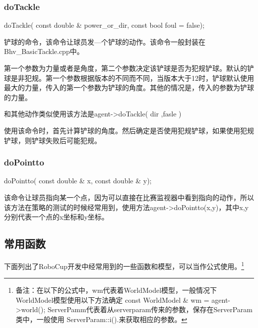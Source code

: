\subsubsection{doTackle}
\begin{Code}
	doTackle( const double & power_or_dir, const bool foul = false);
\end{Code}

铲球的命令，该命令让球员发—个铲球的动作。该命令一般封装在Bhv_BasicTackle.cpp中。

第一个参数为力量或者是角度，第二个参数决定该铲球是否为犯规铲球。默认的铲球是非犯规。第一个参数根据版本的不同而不同，当版本大于12时，铲球默认使用最大的力量，传入的第一个参数为铲球的角度。其他的情况是，传入的参数为铲球的力量。

和其他动作类似使用该方法是agent->doTackle( dir ,fasle )

使用该命令时，首先计算铲球的角度。然后确定是否使用犯规铲球，如果使用犯规铲球，则铲球失败后可能犯规。

\subsubsection{doPointto}
\begin{Code}
doPointto( const double & x, const double & y);
\end{Code}


该命令让球员指向某一个点，因为可以直接在比赛监视器中看到指向的动作，所以该方法在策略的测试的时候经常用到，使用方法agent->doPointto(x,y)，其中x,y分别代表一个点的x坐标和y坐标。 





\subsection{常用函数}
下面列出了RoboCup开发中经常用到的一些函数和模型，可以当作公式使用。\footnote{备注：在以下的公式中，wm代表着WorldModel模型，一般情况下WorldModel模型使用以下方法确定 const WorldModel \& wm = agent->world();	ServerPamm代表着从serverparam传来的参数，保存在ServerParam类中，一般使用 ServerParam::i().来获取相应的参数。}

